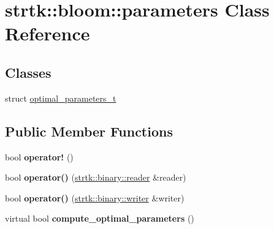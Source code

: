 \hypertarget{classstrtk_1_1bloom_1_1parameters}{\section{strtk\-:\-:bloom\-:\-:parameters Class Reference}
\label{classstrtk_1_1bloom_1_1parameters}
}
\subsection*{Classes}
\begin{DoxyCompactItemize}
\item 
struct \hyperlink{structstrtk_1_1bloom_1_1parameters_1_1optimal__parameters__t}{optimal\-\_\-parameters\-\_\-t}
\end{DoxyCompactItemize}
\subsection*{Public Member Functions}
\begin{DoxyCompactItemize}
\item 
\hypertarget{classstrtk_1_1bloom_1_1parameters_a7a5017ee4ee5c59d18a8c2dabb10251b}{bool {\bfseries operator!} ()}\label{classstrtk_1_1bloom_1_1parameters_a7a5017ee4ee5c59d18a8c2dabb10251b}

\item 
\hypertarget{classstrtk_1_1bloom_1_1parameters_a96af110ad78a5732aac03001c4317a72}{bool {\bfseries operator()} (\hyperlink{classstrtk_1_1binary_1_1reader}{strtk\-::binary\-::reader} \&reader)}\label{classstrtk_1_1bloom_1_1parameters_a96af110ad78a5732aac03001c4317a72}

\item 
\hypertarget{classstrtk_1_1bloom_1_1parameters_a5b46dd32cd01e0528acfdb445fa3589d}{bool {\bfseries operator()} (\hyperlink{classstrtk_1_1binary_1_1writer}{strtk\-::binary\-::writer} \&writer)}\label{classstrtk_1_1bloom_1_1parameters_a5b46dd32cd01e0528acfdb445fa3589d}

\item 
\hypertarget{classstrtk_1_1bloom_1_1parameters_a5f4e0228dc0cc6e7c43364e1c48d9bb8}{virtual bool {\bfseries compute\-\_\-optimal\-\_\-parameters} ()}\label{classstrtk_1_1bloom_1_1parameters_a5f4e0228dc0cc6e7c43364e1c48d9bb8}

\end{DoxyCompactItemize}
